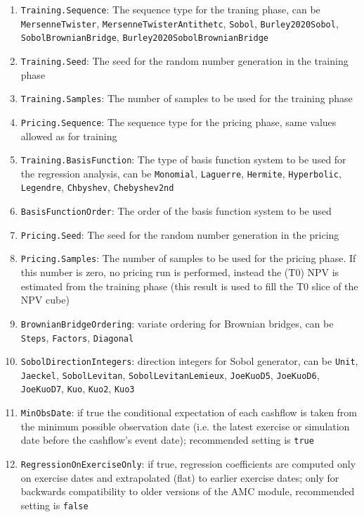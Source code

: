 \documentclass[12pt, a4paper]{article}
\begin{document}
\begin{enumerate}
\item \verb+Training.Sequence+: The sequence type for the traning phase, can be \verb+MersenneTwister+,
  \verb+MersenneTwisterAntithetc+, \verb+Sobol+, \verb+Burley2020Sobol+, \verb+SobolBrownianBridge+,
  \verb+Burley2020SobolBrownianBridge+
\item \verb+Training.Seed+: The seed for the random number generation in the training phase
\item \verb+Training.Samples+: The number of samples to be used for the training phase
\item \verb+Pricing.Sequence+: The sequence type for the pricing phase, same values allowed as for training
\item \verb+Training.BasisFunction+: The type of basis function system to be used for the regression analysis, can be
  \verb+Monomial+, \verb+Laguerre+, \verb+Hermite+, \verb+Hyperbolic+, \verb+Legendre+, \verb+Chbyshev+,
  \verb+Chebyshev2nd+
\item \verb+BasisFunctionOrder+: The order of the basis function system to be used
\item \verb+Pricing.Seed+: The seed for the random number generation in the pricing
\item \verb+Pricing.Samples+: The number of samples to be used for the pricing phase. If this number is zero, no pricing
  run is performed, instead the (T0) NPV is estimated from the training phase (this result is used to fill the T0 slice
  of the NPV cube)
\item \verb+BrownianBridgeOrdering+: variate ordering for Brownian bridges, can be \verb+Steps+, \verb+Factors+,
  \verb+Diagonal+
\item \verb+SobolDirectionIntegers+: direction integers for Sobol generator, can be \verb+Unit+, \verb+Jaeckel+,
  \verb+SobolLevitan+, \verb+SobolLevitanLemieux+, \verb+JoeKuoD5+, \verb+JoeKuoD6+, \verb+JoeKuoD7+,
  \verb+Kuo+, \verb+Kuo2+, \verb+Kuo3+
\item \verb+MinObsDate+: if true the conditional expectation of each cashflow is taken from the minimum possible
  observation date (i.e. the latest exercise or simulation date before the cashflow's event date); recommended setting
  is \verb+true+
\item \verb+RegressionOnExerciseOnly+: if true, regression coefficients are computed only on exercise dates and
  extrapolated (flat) to earlier exercise dates; only for backwards compatibility to older versions of the AMC module,
  recommended setting is \verb+false+
\end{enumerate}
\end{document}
